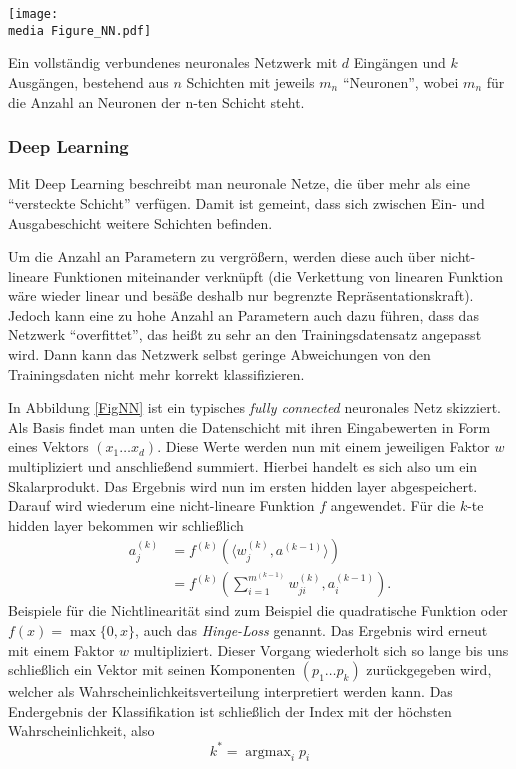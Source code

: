 \begin{dsafigure}
	\begin{center}
		\texttt{[image: \\media Figure\_NN.pdf]}
		\caption{Ein vollständig verbundenes neuronales Netzwerk mit $d$ Eingängen und $k$ Ausgängen, bestehend aus $n$ Schichten mit jeweils $m_n$ \enquote{Neuronen}, wobei $m_n$ für die Anzahl an Neuronen der n-ten Schicht steht.}

		\label{FigNN}
	\end{center}
\end{dsafigure}

\subsubsection{Deep Learning}

Mit Deep Learning beschreibt man neuronale Netze, die über mehr als eine \enquote{versteckte Schicht} verfügen. Damit ist gemeint, dass sich zwischen Ein- und Ausgabeschicht weitere Schichten befinden. 

Um die Anzahl an Parametern zu vergrößern, werden diese auch über nicht-lineare Funktionen miteinander verknüpft (die Verkettung von linearen Funktion wäre wieder linear und besäße deshalb nur begrenzte Repr\"asentationskraft). Jedoch kann eine zu hohe Anzahl an Parametern auch dazu führen, dass das Netzwerk \enquote{overfittet}, das heißt zu sehr an den Trainingsdatensatz angepasst wird. Dann kann das Netzwerk selbst geringe Abweichungen von den Trainingsdaten nicht mehr korrekt klassifizieren.

In Abbildung \ref{FigNN} ist ein typisches \emph{fully connected} neuronales Netz skizziert. Als Basis findet man unten die Datenschicht mit ihren Eingabewerten in Form eines Vektors $(x_1 \dots x_d)$. Diese Werte werden nun mit einem jeweiligen Faktor $w$ multipliziert und anschlie\ss end summiert. Hierbei handelt es sich also um ein Skalarprodukt. Das Ergebnis wird nun im ersten hidden layer abgespeichert. Darauf wird wiederum eine nicht-lineare Funktion $f$ angewendet. Für die $k$-te hidden layer bekommen wir schlie\ss lich
\begin{align*}
a_j^{(k)} &= f^{(k)} (\langle w_{j}^{(k)}, a^{(k-1)}\rangle)\\ &= f^{(k)} \left(\sum_{i=1}^{m^{(k-1)}} w_{ji}^{(k)},a_i^{(k-1)}\right).
\end{align*}
Beispiele f\"ur die Nichtlinearit\"at sind zum Beispiel die quadratische Funktion oder $f(x) = \max\{0, x\}$, auch das \emph{Hinge-Loss} genannt. Das Ergebnis wird erneut mit einem Faktor $w$ multipliziert. Dieser Vorgang wiederholt sich so lange bis uns schließlich ein Vektor mit seinen Komponenten $(p_1 \dots p_k)$ zurückgegeben wird, welcher als Wahrscheinlichkeitsverteilung interpretiert werden kann. Das Endergebnis der Klassifikation ist schlie\ss lich der Index mit der h\"ochsten Wahrscheinlichkeit, also
\begin{equation*}
k^* = \operatorname{argmax}_{i} p_i
\end{equation*}

